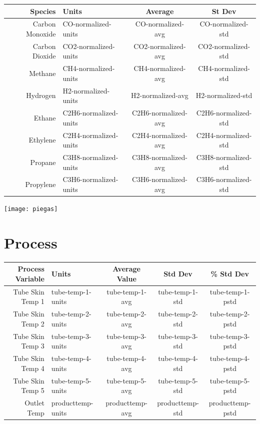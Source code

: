 \documentclass[11pt]{article}
\begin{document}
\begin{table}[h]
\begin{minipage}[th]{0.5\linewidth}
\centering
\begin{tabular}{r l c c}
	Species		& Units				& Average				& St Dev				\\
\hline 	Carbon Monoxide	& CO-normalized-units		& CO-normalized-avg		& CO-normalized-std		\\
	Carbon Dioxide	& CO2-normalized-units		& CO2-normalized-avg		& CO2-normalized-std		\\
	Methane		& CH4-normalized-units		& CH4-normalized-avg		& CH4-normalized-std		\\
	Hydrogen		& H2-normalized-units		& H2-normalized-avg		& H2-normalized-std		\\
	Ethane		& C2H6-normalized-units		& C2H6-normalized-avg		& C2H6-normalized-std		\\
	Ethylene		& C2H4-normalized-units		& C2H4-normalized-avg		& C2H4-normalized-std		\\
	Propane		& C3H8-normalized-units		& C3H8-normalized-avg		& C3H8-normalized-std		\\
	Propylene		& C3H6-normalized-units		& C3H6-normalized-avg		& C3H6-normalized-std		\\
	
\end{tabular}
\end{minipage}
\begin{minipage}[bh]{0.5\linewidth}
\texttt{[image: piegas]}
\end{minipage}
\end{table}


\section*{Process}


\begin{table}[hb]
\centering
\begin{tabular}{r l c c c}
	Process Variable	& Units			& Average Value			& Std Dev		& \% Std Dev \\
\hline
	Tube Skin Temp 1	& tube-temp-1-units	& tube-temp-1-avg		& tube-temp-1-std	& tube-temp-1-pstd \\
	Tube Skin Temp 2	& tube-temp-2-units	& tube-temp-2-avg		& tube-temp-2-std	& tube-temp-2-pstd \\
	Tube Skin Temp 3	& tube-temp-3-units	& tube-temp-3-avg		& tube-temp-3-std	& tube-temp-3-pstd \\
	Tube Skin Temp 4	& tube-temp-4-units	& tube-temp-4-avg		& tube-temp-4-std	& tube-temp-4-pstd \\
	Tube Skin Temp 5	& tube-temp-5-units	& tube-temp-5-avg		& tube-temp-5-std	& tube-temp-5-pstd \\
	Outlet Temp		& producttemp-units	& producttemp-avg		& producttemp-std	& producttemp-pstd 
\end{tabular}
\end{table}
\vspace{-2ex}
\end{document}
